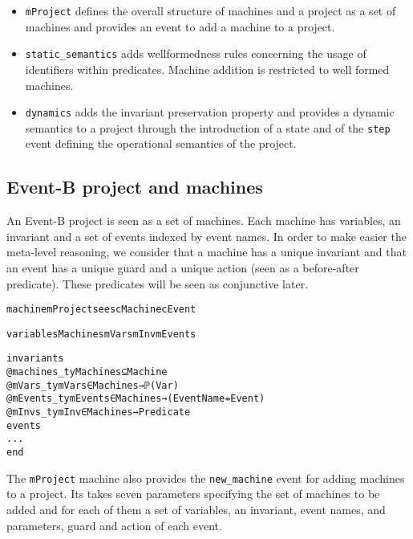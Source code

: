 \documentclass{llncs}
\begin{document}
\begin{itemize}
  \item \texttt{mProject} defines the overall structure of machines
    and a project as a set of machines and provides an event to add a
    machine to a project.

  \item \texttt{static\_semantics} adds wellformedness rules
    concerning the usage of identifiers within predicates. Machine
    addition is restricted to well formed machines.


 \item \texttt{dynamics} adds the invariant preservation property and
    provides a dynamic semantics to a project through the introduction
    of a state and of the \texttt{step} event defining the operational
    semantics of the project.
\end{itemize}

    \subsection{Event-B project and machines}

An Event-B project is seen as a set of machines. Each machine has
variables, an invariant and a set of events indexed by event
names. In order to make easier the meta-level reasoning, we consider
that a machine has a unique invariant and that an event has a unique
guard and a unique action (seen as a before-after predicate). These predicates will be seen as conjunctive later.

\begin{framed}
\begin{small}
\begin{alltt} 
machine mProject sees cMachine cEvent 

variables Machines mVars mInv mEvents 

invariants
  @machines_ty Machines ⊆ Machine
  @mVars_ty mVars ∈ Machines → ℙ(Var)
  @mEvents_ty mEvents ∈ Machines → (EventName ⇸ Event)
  @mInvs_ty mInv ∈ Machines → Predicate
events
  ...
end
\end{alltt}
\end{small}
\end{framed}

The \texttt{mProject} machine also provides the \texttt{new\_machine} event for adding
machines to a project. Its takes seven parameters specifying the set of
machines to be added and for each of them a set of variables, an
invariant, event names, and parameters, guard and action of each event.
\end{document}
